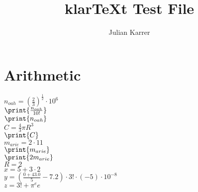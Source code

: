\documentclass[oneside, a4paper]{article}
\author{Julian Karrer}
\title{klarTeXt Test File}
\begin{document}
\maketitle
\section*{Arithmetic}

\begin{program}

$n_{oah} = \left(\frac{2}{3}\right)^{\frac{1}{2}}\cdot 10^{6}$\\
$\print{\frac{n_{oah}}{10!}}$\\
$\print{n_{oah}}$\\
$C = \frac{4}{3}\pi R^3$\\
$\print{C}$\\
$m_{arie} = 2 \cdot 11$\\
$\print{m_{arie}}$\\
$\print{2m_{arie}}$\\
$R = 2$\\
$x = 5+3\cdot 2$\\
$y = \left(\frac{0+43.0}{5}-7.2\right)\cdot 3! \cdot (-5) \cdot 10^{-8}$\\
$z = 3! + \pi^e e$\\

\end{program}
\end{document}
